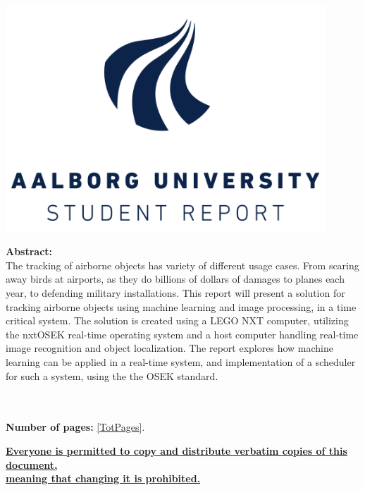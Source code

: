 \begin{minipage}[T]{0.45\textwidth}
 \begin{flushright}
  \includegraphics[width=0.9\textwidth]{images/aau_logo.pdf}\\
 \end{flushright}
 \begin{flushleft}
  \textbf{Abstract:}\\
  	The tracking of airborne objects has variety of different usage cases. 
  	 From scaring away birds at airports, as they do billions of dollars of damages to planes each year, to defending military installations.
    This report will present a solution for tracking airborne objects using machine learning and image processing, in a time critical system.
    The solution is created using a LEGO NXT computer, utilizing the nxtOSEK real-time operating system and a host computer handling real-time image recognition and object localization.
    The report explores how machine learning can be applied in a real-time system, and implementation of a scheduler for such a system, using the the OSEK standard.
 \end{flushleft}
\end{minipage}\\
\\\large{\textsf{\textbf{\normalsize{Number of pages:}}}} \ref{TotPages}.\\
\begin{center}
 \begin{scriptsize}
  \textbf{\underline{Everyone is permitted to copy and distribute verbatim copies of this document,}}\\ \textbf{\underline{ meaning that changing it is prohibited.}}
 \end{scriptsize}
\end{center}
